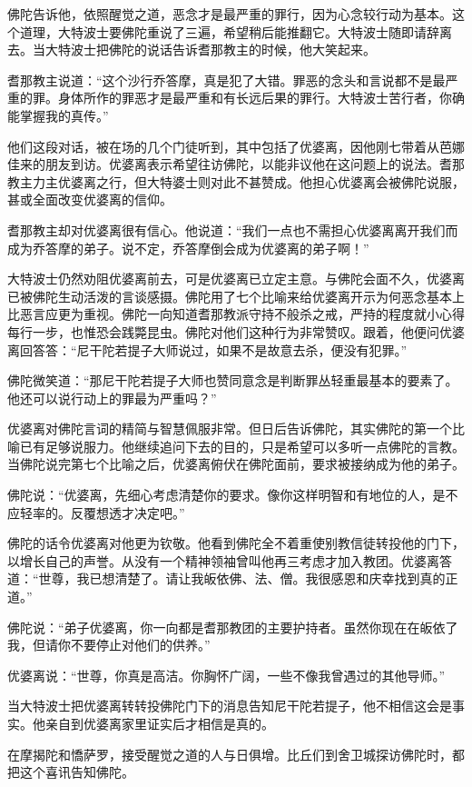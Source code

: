 \documentclass[12pt,twoside,openany]{book}
\begin{document}
佛陀告诉他，依照醒觉之道，恶念才是最严重的罪行，因为心念较行动为基本。这个道理，大特波士要佛陀重说了三遍，希望稍后能推翻它。大特波士随即请辞离去。当大特波士把佛陀的说话告诉耆那教主的时候，他大笑起来。

耆那教主说道：“这个沙行乔答摩，真是犯了大错。罪恶的念头和言说都不是最严重的罪。身体所作的罪恶才是最严重和有长远后果的罪行。大特波士苦行者，你确能掌握我的真传。”

他们这段对话，被在场的几个门徒听到，其中包括了优婆离，因他刚七带着从芭娜佳来的朋友到访。优婆离表示希望往访佛陀，以能非议他在这问题上的说法。耆那教主力主优婆离之行，但大特婆士则对此不甚赞成。他担心优婆离会被佛陀说服，甚或全面改变优婆离的信仰。

耆那教主却对优婆离很有信心。他说道：“我们一点也不需担心优婆离离开我们而成为乔答摩的弟子。说不定，乔答摩倒会成为优婆离的弟子啊！”

大特波士仍然劝阻优婆离前去，可是优婆离已立定主意。与佛陀会面不久，优婆离已被佛陀生动活泼的言谈感摄。佛陀用了七个比喻来给优婆离开示为何恶念基本上比恶言应更为重视。佛陀一向知道耆那教派守持不般杀之戒，严持的程度就小心得每行一步，也惟恐会践斃昆虫。佛陀对他们这种行为非常赞叹。跟着，他便问优婆离回答答：“尼干陀若提子大师说过，如果不是故意去杀，便没有犯罪。”

佛陀微笑道：“那尼干陀若提子大师也赞同意念是判断罪丛轻重最基本的要素了。他还可以说行动上的罪最为严重吗？”

优婆离对佛陀言词的精简与智慧佩服非常。但日后告诉佛陀，其实佛陀的第一个比喻已有足够说服力。他继续追问下去的目的，只是希望可以多听一点佛陀的言教。当佛陀说完第七个比喻之后，优婆离俯伏在佛陀面前，要求被接纳成为他的弟子。

佛陀说：“优婆离，先细心考虑清楚你的要求。像你这样明智和有地位的人，是不应轻率的。反覆想透才决定吧。”

佛陀的话令优婆离对他更为钦敬。他看到佛陀全不着重使别教信徒转投他的门下，以增长自己的声誉。从没有一个精神领袖曾叫他再三考虑才加入教团。优婆离答道：“世尊，我已想清楚了。请让我皈依佛、法、僧。我很感恩和庆幸找到真的正道。”

佛陀说：“弟子优婆离，你一向都是耆那教团的主要护持者。虽然你现在在皈依了我，但请你不要停止对他们的供养。”

优婆离说：“世尊，你真是高洁。你胸怀广阔，一些不像我曾遇过的其他导师。”

当大特波士把优婆离转转投佛陀门下的消息告知尼干陀若提子，他不相信这会是事实。他亲自到优婆离家里证实后才相信是真的。

在摩揭陀和憍萨罗，接受醒觉之道的人与日俱增。比丘们到舍卫城探访佛陀时，都把这个喜讯告知佛陀。
\end{document}
